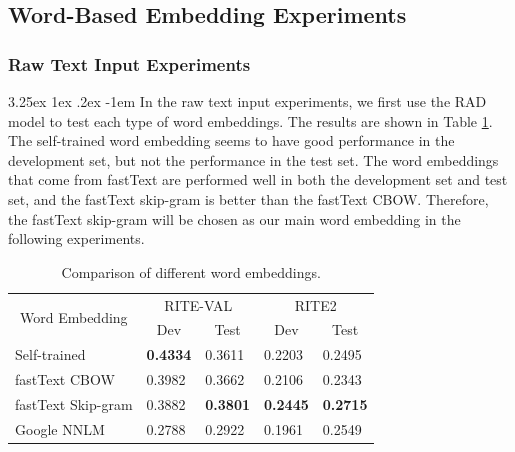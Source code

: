 \documentclass[12pt]{article}
\makeatletter
\renewcommand\paragraph{\@startsection{paragraph}{5}{\z@}%
  {3.25ex \@plus1ex \@minus.2ex}%
  {-1em}%
  {\normalfont\normalsize\bfseries}}
\makeatother
\begin{document}
\begin{CJK*}{UTF8}{bkai}
\begin{spacing}{1.77}
\subsection{Word-Based Embedding Experiments}
\subsubsection{Raw Text Input Experiments}
\paragraph{}
In the raw text input experiments, we first use the RAD model to test each type of word embeddings. The results are shown in Table \ref{result:nnlm_comparison}. The self-trained word embedding seems to have good performance in the development set, but not the performance in the test set. The word embeddings that come from fastText are performed well in both the development set and test set, and the fastText skip-gram is better than the fastText CBOW. Therefore, the fastText skip-gram will be chosen as our main word embedding in the following experiments.

\begin{table}[H]
  \centering
  \setlength{\extrarowheight}{-3pt}
  \begin{tabular}{|l|l|l|l|l|}
  \hline
  \multicolumn{1}{|c|}{\multirow{2}{*}{Word   Embedding}} & \multicolumn{2}{c|}{RITE-VAL} & \multicolumn{2}{c|}{RITE2} \\ \cline{2-5}
  \multicolumn{1}{|c|}{} & \multicolumn{1}{c|}{Dev} & \multicolumn{1}{c|}{Test} & \multicolumn{1}{c|}{Dev} & \multicolumn{1}{c|}{Test} \\ \hline
  Self-trained & \textbf{0.4334} & 0.3611 & 0.2203 & 0.2495 \\ \hline
  fastText CBOW & 0.3982 & 0.3662 & 0.2106 & 0.2343 \\ \hline
  fastText Skip-gram & 0.3882 & \textbf{0.3801} & \textbf{0.2445} & \textbf{0.2715} \\ \hline
  Google NNLM & 0.2788 & 0.2922 & 0.1961 & 0.2549 \\ \hline
  \end{tabular}
  \caption{Comparison of different word embeddings.}
  \label{result:nnlm_comparison}
\end{table}


\end{spacing}
\end{CJK*}
\end{document}
